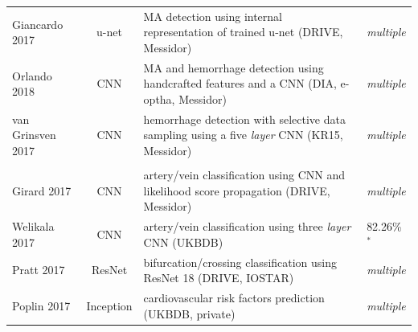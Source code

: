 \documentclass[journal]{IEEEtran}
\begin{document}
\begin{table}[!t]
\begin{minipage}{\textwidth}
\begin{tabularx}{\textwidth}{l c l l}
			Giancardo 2017\cite{giancardo2017representation} & u-net          & MA detection using internal representation of trained u-net (DRIVE, Messidor)                      & \textit{multiple}                                      \\
			Orlando 2018\cite{orlando2018ensemble}           & CNN            & MA and hemorrhage detection using handcrafted features and a CNN (DIA, e-optha, Messidor)          & \textit{multiple}                                      \\
			van Grinsven 2017\cite{van2016fast}              & CNN            & hemorrhage detection with selective data sampling using a five \textit{layer} CNN (KR15, Messidor) & \textit{multiple}                                      \\
			\midrule
			\multicolumn{4}{l}{\thead{Other applications}}                                                                                                                                                                         \\
			\midrule
			Girard 2017\cite{girard2017artery}               & CNN            & artery/vein classification using CNN and likelihood score propagation (DRIVE, Messidor)            & \textit{multiple}                                      \\
			Welikala 2017\cite{welikala2017automated}        & CNN            & artery/vein classification using three \textit{layer} CNN (UKBDB)                                  & 82.26\%$^*$                                   \\
			Pratt 2017\cite{pratt2017automatica}             & ResNet         & bifurcation/crossing classification using ResNet 18 (DRIVE, IOSTAR)                                & \textit{multiple}                                      \\
			Poplin 2017\cite{poplin2017predicting}           & Inception      & cardiovascular risk factors prediction (UKBDB, private)                                            & \textit{multiple}                                      \\
			\bottomrule
		\end{tabularx}
	\end{minipage}
\end{table}
\end{document}
